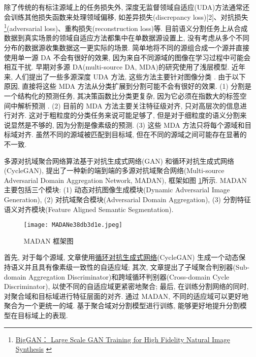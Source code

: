 除了传统的有标注源域上的任务损失外, 深度无监督领域自适应(UDA)方法通常还会训练其他损失函数来处理领域偏移, 如差异损失(discrepancy loss)[2]、对抗损失\footnote{\href{https://colab.research.google.com/github/tensorflow/hub/blob/master/examples/colab/biggan_generation_with_tf_hub.ipynb}{BigGAN： Large Scale GAN Training for High Fidelity Natural Image Synthesis} \label{GANnote2020031201}}(adversarial loss)\cite{ZhuPark20178237506}、重构损失(reconstruction loss)\cite{GoodfellowGAN2014}等.
目前语义分割任务上从合成数据到真实场景的领域自适应方法都集中在单数据源设置上, 没有考虑从多个不同分布的数据源收集数据这一更实际的场景. 简单地将不同的源组合成一个源并直接使用单一源 DA 不会有很好的效果, 因为来自不同源域的图像在学习过程中可能会相互干扰. 早期对多源 DA(multi-source DA,  MDA)的研究使用了浅层模型.
近年来, 人们提出了一些多源深度 UDA 方法, 这些方法主要针对图像分类 \cite{Ghifary2015}. 由于以下原因, 直接将这些 MDA 方法从分类扩展到分割可能不会有很好的效果. (1) 分割是一个结构化的预测任务, 其决策函数比分类更复杂, 因为它必须在指数大的标签空间中解析预测 \cite{Zhang2017}. (2) 目前的 MDA 方法主要关注特征级对齐, 只对高层次的信息进行对齐. 这对于粗粒度的分类任务来说可能足够了, 但是对于细粒度的语义分割来说显然是不够的, 因为分割是像素级的预测. (3) 这些 MDA 方法只将每个源域和目标域对齐. 虽然不同的源域被匹配到目标域, 但在不同的源域之间可能存在显著的不一致.

多源对抗域聚合网络算法基于对抗生成式网络(GAN)\cite{GoodfellowGAN2014} 和循环对抗生成式网络(CycleGAN)\cite{ZhuPark20178237506}, 提出了一种新的端到端的多源对抗域聚合网络(Multi-source Adversarial Domain Aggregation Network,  MADAN), 框架如图 \ref{MADANe38db3d1e}所示. MADAN 主要包括三个模块: (1) 动态对抗图像生成模块(Dynamic Adversarial Image Generation), (2) 对抗域聚合模块(Adversarial Domain Aggregation), (3) 分割特征语义对齐模块(Feature Aligned Semantic Segmentation).
\begin{figure}[H]
	\centering
	\texttt{[image: MADANe38db3d1e.jpeg]}
	\caption{MADAN 框架图}
   \label{MADANe38db3d1e}
\end{figure}
首先, 对于每个源域, 文章使用\href{https://blog.csdn.net/dugudaibo/article/details/82903233}{循环对抗生成式网络}(CycleGAN)\cite{Long2015CVPR} 生成一个动态保持语义并且具有像素级一致性的自适应域;
其次, 文章提出了子域聚合判别器(Sub-domain Aggregation Discriminator)和跨域循环判别器(Cross-domain Cycle Discriminator), 以使不同的自适应域更紧密地聚合; 最后, 在训练分割网络的同时, 对聚合域和目标域进行特征层面的对齐.
通过 MADAN, 不同的适应域可以更好地聚合为一个更统一的域. 基于聚合域对分割模型进行训练, 能够更好地提升分割模型在目标域上的表现.
